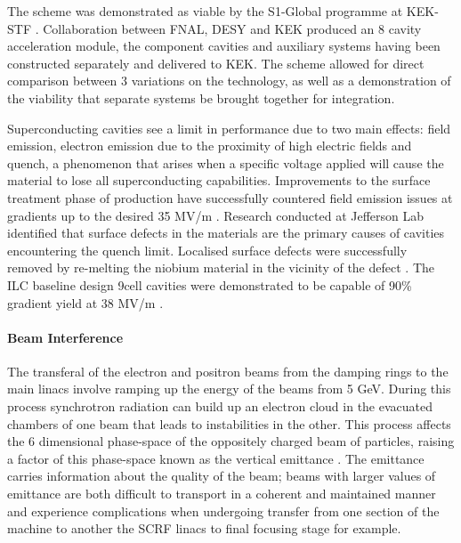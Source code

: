 The scheme was demonstrated as viable by the S1-Global programme at KEK-STF \cite{IPAC:S1Module}. Collaboration between FNAL, DESY and KEK produced an 8 cavity acceleration module, the component cavities and auxiliary systems having been constructed separately and delivered to KEK. The scheme allowed for direct comparison between 3 variations on the technology, as well as a demonstration of the viability that separate systems be brought together for integration.

Superconducting cavities see a limit in performance due to two main effects: field emission, electron emission due to the proximity of high electric fields and quench, a phenomenon that arises when a specific voltage applied will cause the material to lose all superconducting capabilities. Improvements to the surface treatment phase of production have successfully countered field emission issues at gradients up to the desired 35 MV/m \cite{ILC:TechnicalDesignReport}. Research conducted at Jefferson Lab identified that surface defects in the materials are the primary causes of cavities encountering the quench limit. Localised surface defects were successfully removed by re-melting the niobium material in the vicinity of the defect \cite{SRF:Gradient}. The ILC baseline design 9\textendash cell cavities were demonstrated to be capable of 90\% gradient yield at 38 MV/m \cite{IPAC:SRFGradient}.  

\paragraph{Beam Interference}

The transferal of the electron and positron beams from the damping rings to the main linacs involve ramping up the energy of the beams from 5 GeV. During this process synchrotron radiation can build up an electron cloud in the evacuated chambers of one beam that leads to instabilities in the other. This process affects the 6 dimensional phase-space of the oppositely charged beam of particles, raising a factor of this phase-space known as the vertical emittance \cite{SSolutions:BeamEmittance}. The emittance carries information about the quality of the beam; beams with larger values of emittance are both difficult to transport in a coherent and maintained manner and experience complications when undergoing transfer from one section of the machine to another \textendash the SCRF linacs to final focusing stage for example.

